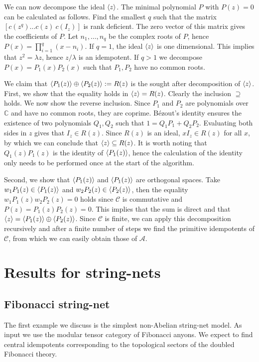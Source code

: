 \documentclass[12 pt]{article}
\begin{document}
We can now decompose the ideal $\braket{z}$. The minimal polynomial $P$ with $P(z)=0$ can be calculated as follows. Find the smallest $q$ such that the matrix $[c(z^q) \dots c(z)\: c(I_z)]$ is rank deficient. The zero vector of this matrix gives the coefficients of $P$. Let $n_1,\ldots,n_q$ be the complex roots of $P$, hence $P(x)=\prod_{i=1}^q (x-n_i)$. If $q=1$, the ideal $\braket{z}$ is one dimensional. This implies that $z^2=\lambda z$, hence $z/\lambda$ is an idempotent. If $q>1$ we decompose $P(x)=P_1(x)P_2(x)$ such that $P_1,P_2$ have no common roots.

We claim that $\braket{P_1(z)}\oplus\braket{P_2(z)}:=R(z)$ is the sought after decomposition of $\braket{z}$.
First, we show that the equality holds in $\braket{z}=R(z)$. Clearly the inclusion $\supseteq$ holds. We now show the reverse inclusion. Since $P_1$ and $P_2$ are polynomials over $\mathbb{C}$ and have no common roots, they are coprime. B\'ezout's identity ensures the existence of two polynomials $Q_1,Q_2$ such that $1=Q_1P_1+Q_2P_2$. Evaluating both sides in $z$ gives that $I_z \in R(z)$. Since $R(z)$ is an ideal, $xI_z \in R(z)$ for all $x$, by which we can conclude that $\braket{z} \subseteq R(z)$. It is worth noting that $Q_1(z)P_1(z)$ is the identity of $\braket{P_1(z)}$, hence the calculation of the identity only needs to be performed once at the start of the algorithm.

Second, we show that $\braket{P_1(z)}$ and $\braket{P_1(z)}$ are orthogonal spaces. Take $w_1P_1(z) \in \braket{P_1(z)}$ and $w_2P_2(z) \in \braket{P_2(z)}$, then the equality $w_1P_1(z)w_2P_2(z)=0$ holds since $\mathcal{C}$ is commutative and $P(z)=P_1(z)P_2(z)=0$. This implies that the sum is direct and that $\braket{z}=\braket{P_1(z)}\oplus\braket{P_2(z)}$. Since $\mathcal{C}$ is finite, we can apply this decomposition recursively and after a finite number of steps we find the primitive idempotents of $\mathcal{C}$, from which we can easily obtain those of $\mathcal{A}$.

\section{Results for string-nets}\label{sec:snidempotents}\label{app:snresults}

\subsection{Fibonacci string-net}\label{app:fibresults}
The first example we discuss is the simplest non-Abelian string-net model. As input we use the modular tensor category of Fibonacci anyons. We expect to find central idempotents corresponding to the topological sectors of the doubled Fibonacci theory.
\end{document}
